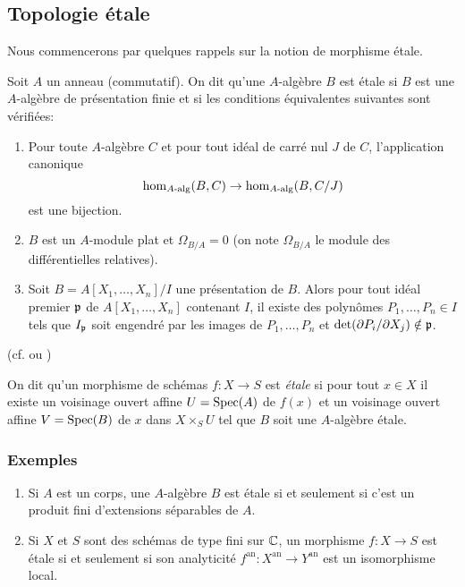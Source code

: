 \documentclass[oneside]{book}
\begin{document}
\subsection{Topologie étale}\label{I:2-1}

Nous commencerons par quelques rappels sur la notion de morphisme étale. 

\begin{definition}\label{I:2-1-1}
Soit $A$ un anneau (commutatif). On dit qu'une $A$-algèbre $B$ est étale si 
$B$ est une $A$-algèbre de présentation finie et si les conditions 
équivalentes suivantes sont vérifiées:
\begin{enumerate}[\indent a)]
  \item Pour toute $A$-algèbre $C$ et pour tout idéal de carré nul $J$ de 
    $C$, l'application canonique 
    \[
      \hom_{A\textnormal{-alg}}(B,C) \to \hom_{A\textnormal{-alg}}(B,C/J)
    \]
    est une bijection.
  \item $B$ est un $A$-module plat et $\Omega_{B/A}=0$ (on note $\Omega_{B/A}$ 
    le module des différentielles relatives).
  \item Soit $B=A[X_1,\dotsc,X_n]/I$ une présentation de $B$. Alors pour tout 
    idéal premier $\mathfrak{p}$ de $A[X_1,\dotsc,X_n]$ contenant $I$, il existe des 
    polynômes $P_1,\dotsc,P_n\in I$ tels que $I_{\mathfrak{p}}$ soit engendré par les 
    images de $P_1,\dotsc,P_n$ et $\det(\partial P_i/\partial X_j)\notin \mathfrak{p}$.  
\end{enumerate}
\end{definition}
(cf. \cite[I]{7} ou \cite[V]{11})

On dit qu'un morphisme de schémas $f:X\to S$ est \emph{étale} si pour tout 
$x\in X$ il existe un voisinage ouvert affine $U=\operatorname{Spec}(A)$ de $f(x)$ et un 
voisinage ouvert affine $V=\operatorname{Spec}(B)$ de $x$ dans $X\times_S U$ tel que $B$ soit 
une $A$-algèbre étale. 





\subsubsection{Exemples}\label{I:2-1-2}
\begin{enumerate}[\indent a)]
  \item Si $A$ est un corps, une $A$-algèbre $B$ est étale si et seulement 
    si c'est un produit fini d'extensions séparables de $A$. 
  \item Si $X$ et $S$ sont des schémas de type fini sur $\mathbb{C}$, un morphisme 
    $f:X\to S$ est étale si et seulement si son analyticité 
    $f^{\text{an}}:X^{\text{an}}\to Y^{\text{an}}$ est un isomorphisme local.
\end{enumerate}
\end{document}
